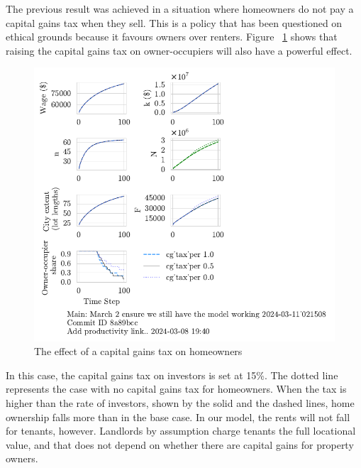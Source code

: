 The previous result was achieved in a situation where homeowners do not pay a capital gains tax when they sell. This is a policy that has been questioned on ethical grounds because it favours owners over renters.  Figure ~\ref{fig:CGpers_ownership_trajectory} shows that raising the capital gains tax on owner-occupiers will also have a powerful effect. 

\begin{figure}
    \centering
    \includegraphics[scale=.8, trim={0 1.4cm 0 0},clip]{fig/cg_tax_per-Main-021508.pdf}
    \caption{The effect of a capital gains tax on homeowners}
    \label{fig:CGpers_ownership_trajectory}
\end{figure}
In this case, the capital gains tax on investors is set at 15\%. The dotted line represents the case with no capital gains tax for homeowners. When the tax is higher than the rate of investors, shown by the solid and the dashed lines,  home ownership falls more than in the base case. In our model, the rents will not fall for tenants, however. Landlords by assumption charge tenants the full locational value, and that does not depend on whether there are capital gains for property owners.

\newpage


